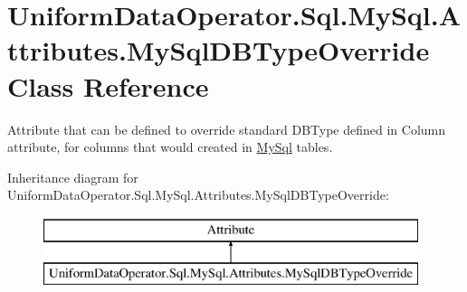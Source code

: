 \hypertarget{class_uniform_data_operator_1_1_sql_1_1_my_sql_1_1_attributes_1_1_my_sql_d_b_type_override}{}\section{Uniform\+Data\+Operator.\+Sql.\+My\+Sql.\+Attributes.\+My\+Sql\+D\+B\+Type\+Override Class Reference}
\label{class_uniform_data_operator_1_1_sql_1_1_my_sql_1_1_attributes_1_1_my_sql_d_b_type_override}


Attribute that can be defined to override standard D\+B\+Type defined in Column attribute, for columns that would created in \mbox{\hyperlink{namespace_uniform_data_operator_1_1_sql_1_1_my_sql}{My\+Sql}} tables.  


Inheritance diagram for Uniform\+Data\+Operator.\+Sql.\+My\+Sql.\+Attributes.\+My\+Sql\+D\+B\+Type\+Override\+:\begin{figure}[H]
\begin{center}
\leavevmode
\includegraphics[height=2.000000cm]{dc/d3f/class_uniform_data_operator_1_1_sql_1_1_my_sql_1_1_attributes_1_1_my_sql_d_b_type_override}
\end{center}
\end{figure}
